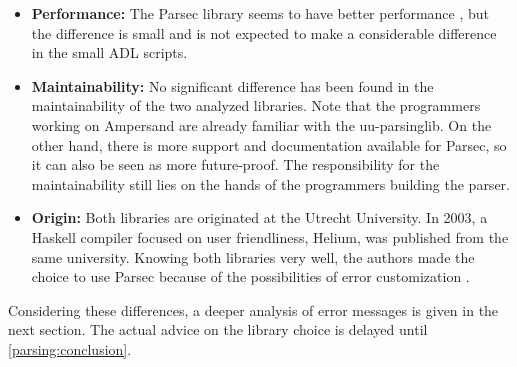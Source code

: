 \begin{itemize}
	\item \textbf{Performance:} The Parsec library seems to have better performance , but the difference is small and is not expected to make a considerable difference in the small ADL scripts.
	\item \textbf{Maintainability:} No significant difference has been found in the maintainability of the two analyzed libraries.
		Note that the programmers working on Ampersand are already familiar with the uu-parsinglib.
		On the other hand, there is more support and documentation available for Parsec, so it can also be seen as more future-proof.
		The responsibility for the maintainability still lies on the hands of the programmers building the parser.
	\item \textbf{Origin:} Both libraries are originated at the Utrecht University.
		In 2003, a Haskell compiler focused on user friendliness, Helium, was published from the same university.
		Knowing both libraries very well, the authors made the choice to use Parsec because of the possibilities of error customization .
\end{itemize}
%
Considering these differences, a deeper analysis of error messages is given in the next section.
The actual advice on the library choice is delayed until \autoref{parsing:conclusion}.
